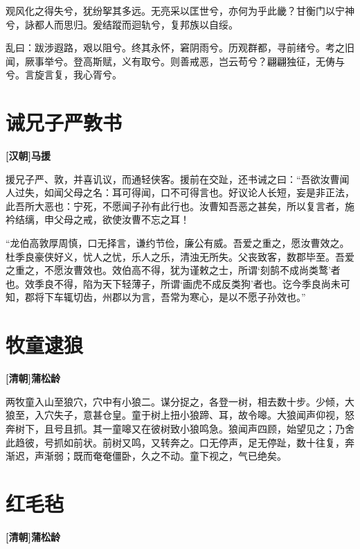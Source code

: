 \documentclass[UTF8,titlepage,oneside]{ctexbook}
\begin{document}
观风化之得失兮，犹纷挐其多远。无亮采以匡世兮，亦何为乎此畿？甘衡门以宁神兮，詠都人而思归。爰结蹤而迴轨兮，复邦族以自绥。

乱曰：跋涉遐路，艰以阻兮。终其永怀，窘阴雨兮。历观群都，寻前绪兮。考之旧闻，厥事举兮。登高斯赋，义有取兮。则善戒恶，岂云苟兮？翩翩独征，无俦与兮。言旋言复，我心胥兮。


\chapter*{诫兄子严敦书}
\begin{center}
	\textbf{[汉朝]马援}
\end{center}


援兄子严、敦，并喜讥议，而通轻侠客。援前在交趾，还书诫之曰：“吾欲汝曹闻人过失，如闻父母之名：耳可得闻，口不可得言也。好议论人长短，妄是非正法，此吾所大恶也：宁死，不愿闻子孙有此行也。汝曹知吾恶之甚矣，所以复言者，施衿结缡，申父母之戒，欲使汝曹不忘之耳！


“龙伯高敦厚周慎，口无择言，谦约节俭，廉公有威。吾爱之重之，愿汝曹效之。杜季良豪侠好义，忧人之忧，乐人之乐，清浊无所失。父丧致客，数郡毕至。吾爱之重之，不愿汝曹效也。效伯高不得，犹为谨敕之士，所谓‘刻鹄不成尚类鹜’者也。效季良不得，陷为天下轻薄子，所谓‘画虎不成反类狗’者也。讫今季良尚未可知，郡将下车辄切齿，州郡以为言，吾常为寒心，是以不愿子孙效也。”



\chapter*{牧童逮狼}
\begin{center}
	\textbf{[清朝]蒲松龄}
\end{center}


两牧童入山至狼穴，穴中有小狼二。谋分捉之，各登一树，相去数十步。少倾，大狼至，入穴失子，意甚仓皇。童于树上扭小狼蹄、耳，故令嗥。大狼闻声仰视，怒奔树下，且号且抓。其一童嗥又在彼树致小狼鸣急。狼闻声四顾，始望见之；乃舍此趋彼，号抓如前状。前树又鸣，又转奔之。口无停声，足无停趾，数十往复，奔渐迟，声渐弱；既而奄奄僵卧，久之不动。童下视之，气已绝矣。



\chapter*{红毛毡}
\begin{center}
	\textbf{[清朝]蒲松龄}
\end{center}
\end{document}
